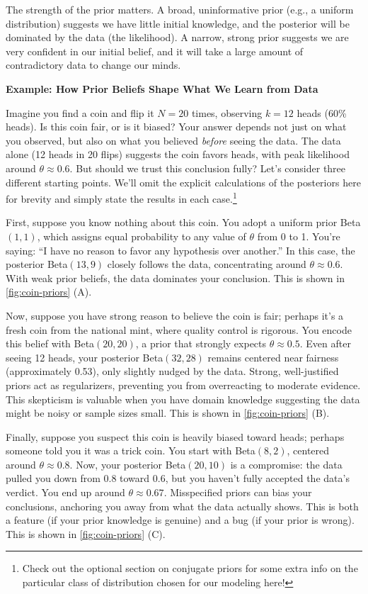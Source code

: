 The strength of the prior matters. A broad, uninformative prior (e.g., a uniform distribution) suggests we have little initial knowledge, and the posterior will be dominated by the data (the likelihood). A narrow, strong prior suggests we are very confident in our initial belief, and it will take a large amount of contradictory data to change our minds.

\begin{exampleBox}
    \textbf{Example: How Prior Beliefs Shape What We Learn from Data}
    
    Imagine you find a coin and flip it $N=20$ times, observing $k=12$ heads (60\% heads). Is this coin fair, or is it biased? Your answer depends not just on what you observed, but also on what you believed \emph{before} seeing the data. The data alone (12 heads in 20 flips) suggests the coin favors heads, with peak likelihood around $\theta \approx 0.6$. But should we trust this conclusion fully? Let's consider three different starting points. We'll omit the explicit calculations of the posteriors here for brevity and simply state the results in each case.\footnote{Check out the optional section on conjugate priors for some extra info on the particular class of distribution chosen for our modeling here!}
    
    First, suppose you know nothing about this coin. You adopt a uniform prior Beta$(1,1)$, which assigns equal probability to any value of $\theta$ from 0 to 1. You're saying: ``I have no reason to favor any hypothesis over another.'' In this case, the posterior Beta$(13,9)$ closely follows the data, concentrating around $\theta \approx 0.6$. With weak prior beliefs, the data dominates your conclusion. This is shown in \autoref{fig:coin-priors} (A).
    
    Now, suppose you have strong reason to believe the coin is fair; perhaps it's a fresh coin from the national mint, where quality control is rigorous. You encode this belief with Beta$(20,20)$, a prior that strongly expects $\theta \approx 0.5$. Even after seeing 12 heads, your posterior Beta$(32,28)$ remains centered near fairness (approximately 0.53), only slightly nudged by the data. Strong, well-justified priors act as regularizers, preventing you from overreacting to moderate evidence. This skepticism is valuable when you have domain knowledge suggesting the data might be noisy or sample sizes small. This is shown in \autoref{fig:coin-priors} (B).
    
    Finally, suppose you suspect this coin is heavily biased toward heads; perhaps someone told you it was a trick coin. You start with Beta$(8,2)$, centered around $\theta \approx 0.8$. Now, your posterior Beta$(20,10)$ is a compromise: the data pulled you down from 0.8 toward 0.6, but you haven't fully accepted the data's verdict. You end up around $\theta \approx 0.67$. Misspecified priors can bias your conclusions, anchoring you away from what the data actually shows. This is both a feature (if your prior knowledge is genuine) and a bug (if your prior is wrong). This is shown in \autoref{fig:coin-priors} (C).
    

\end{exampleBox}
